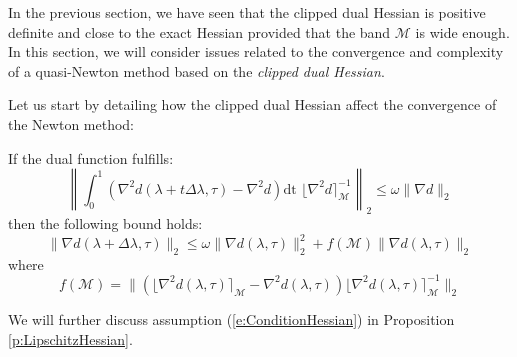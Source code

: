 In the previous section, we have seen that the clipped dual Hessian is positive definite and close  to the exact Hessian provided that the band $\mathcal{M}$ is wide enough. In this section, we will consider issues related to the convergence and complexity of a quasi-Newton method based on the \emph{clipped dual Hessian}.

Let us start by detailing how the clipped dual Hessian affect the convergence of the Newton method:
\begin{theorem} If the dual function fulfills:
\begin{equation} \label{e:ConditionHessian}
\left\| \int_0^1 ( \nabla^2 d(\lambda + t \Delta \lambda, \tau) - \nabla^2 d ) \text{dt } \lfloor \nabla^2 d \rceil_{\mathcal{M}}^{-1} \right\|_2 \leq \omega \| \nabla d \|_2
\end{equation}
then the following bound holds:
\begin{equation} \label{e:Convergence}
\| \nabla d(\lambda + \Delta \lambda,\tau) \|_2 \leq \omega \| \nabla d(\lambda, \tau) \|_2^2 + f(\mathcal{M}) \| \nabla d(\lambda, \tau) \|_2
\end{equation}
where
\begin{equation}
f(\mathcal{M}) = \| (\lfloor \nabla^2 d(\lambda, \tau) \rceil_{\mathcal{M}} - \nabla^2 d(\lambda,\tau) ) \lfloor \nabla^2 d(\lambda, \tau) \rceil_{\mathcal{M}}^{-1} \|_2
\end{equation}
\end{theorem}
\begin{remark}
We will further discuss assumption (\ref{e:ConditionHessian}) in Proposition \ref{p:LipschitzHessian}.
\end{remark}

